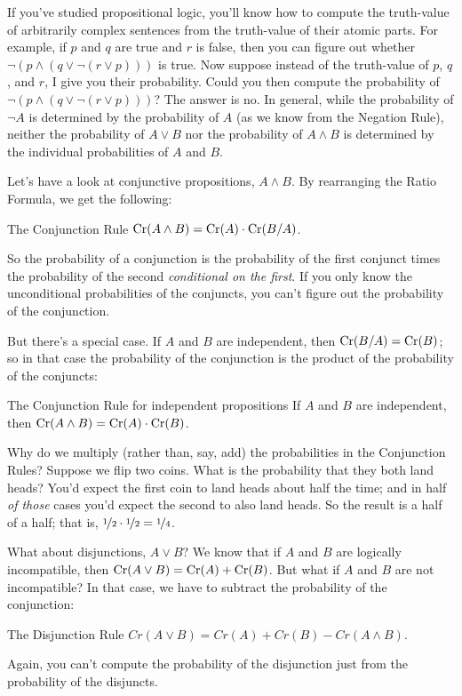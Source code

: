 If you've studied propositional logic, you'll know how to compute the
truth-value of arbitrarily complex sentences from the truth-value of
their atomic parts. For example, if $p$ and $q$ are true and $r$ is
false, then you can figure out whether
$\neg(p \land (q \lor \neg(r \lor p)))$ is true. Now suppose instead
of the truth-value of $p$, $q$, and $r$, I give you their probability.
Could you then compute the probability of
$\neg (p \land (q \lor \neg(r \lor p)))$? The answer is no. In
general, while the probability of $\neg A$ is determined by the
probability of $A$ (as we know from the Negation Rule), neither the
probability of $A\lor B$ nor the probability of $A \land B$ is
determined by the individual probabilities of $A$ and $B$.

Let's have a look at conjunctive propositions, $A \land B$. By
rearranging the Ratio Formula, we get the following:
%
\begin{genericthm}{The Conjunction Rule}
  $\text{Cr}(A \land B) = \text{Cr}(A) \cdot \text{Cr}(B / A)$.
\end{genericthm}
%
So the probability of a conjunction is the probability of the first
conjunct times the probability of the second \emph{conditional on the
  first}. If you only know the unconditional probabilities of the
conjuncts, you can't figure out the probability of the conjunction.

But there's a special case. If $A$ and $B$ are independent,
then $\text{Cr}(B/A) = \text{Cr}(B)$; so in that case the probability of the
conjunction is the product of the probability of the conjuncts:
%
\begin{genericthm}{The Conjunction Rule for independent propositions}
  If $A$ and $B$ are independent, then $\text{Cr}(A \land B) = \text{Cr}(A) \cdot
  \text{Cr}(B)$.
\end{genericthm}

Why do we multiply (rather than, say, add) the probabilities in the
Conjunction Rules? Suppose we flip two coins. What is the probability
that they both land heads? You'd expect the first coin to land heads
about half the time; and in half \emph{of those} cases you'd expect
the second to also land heads. So the result is a half of a half; that
is, $\nicefrac{1}{2} \cdot \nicefrac{1}{2} = \nicefrac{1}{4}$.

What about disjunctions, $A \lor B$? We know that if $A$ and $B$ are
logically incompatible, then $\text{Cr}(A \lor B) = \text{Cr}(A) + \text{Cr}(B)$. But
what if $A$ and $B$ are not incompatible? In that case, we have to
subtract the probability of the conjunction:
%
\begin{genericthm}{The Disjunction Rule}
  $Cr(A \lor B) = Cr(A) + Cr(B) - Cr(A\land B)$.
\end{genericthm}
%
Again, you can't compute the probability of the disjunction just from
the probability of the disjuncts.

